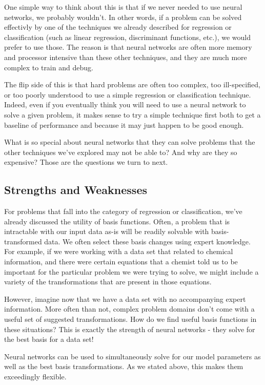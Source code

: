 One simple way to think about this is that if we never needed to use neural networks, we probably wouldn't. In other words, if a problem can be solved effectivly by one of the techniques we already described for regression or classification (such as linear regression, discriminant functions, etc.), we would prefer to use those. The reason is that neural networks are often more memory and processor intensive than these other techniques, and they are much more complex to train and debug.

The flip side of this is that hard problems are often too complex, too ill-specified, or too poorly understood to use a simple regression or classification technique. Indeed, even if you eventually think you will need to use a neural network to solve a given problem, it makes sense to try a simple technique first both to get a baseline of performance and because it may just happen to be good enough.

What is so special about neural networks that they can solve problems that the other techniques we've explored may not be able to? And why are they so expensive? Those are the questions we turn to next.

\subsection{Strengths and Weaknesses}
For problems that fall into the category of regression or classification, we've already discussed the utility of basis functions. Often, a problem that is intractable with our input data as-is will be readily solvable with basis-transformed data. We often select these basis changes using expert knowledge. For example, if we were working with a data set that related to chemical information, and there were certain equations that a chemist told us to be important for the particular problem we were trying to solve, we might include a variety of the transformations that are present in those equations.

However, imagine now that we have a data set with no accompanying expert information. More often than not, complex problem domains don't come with a useful set of suggested transformations. How do we find useful basis functions in these situations? This is exactly the strength of neural networks - they solve for the best basis for a data set!

Neural networks can be used to simultaneously solve for our model parameters as well as the best basis transformations. As we stated above, this makes them exceedingly flexible.

